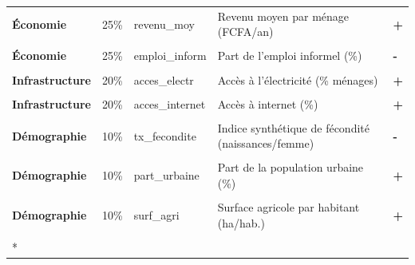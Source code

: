 \documentclass[
]{article}
\begin{document}
\begin{longtable}[t]{>{}lll>{\raggedright\arraybackslash}p{7cm}>{}l}
\textcolor[HTML]{B92346}{\textbf{Économie}} & 25\% & revenu\_moy & Revenu moyen par ménage (FCFA/an) & \textbf{+}\\
\addlinespace
\textcolor[HTML]{B92346}{\textbf{\cellcolor{gray!10}{Économie}}} & \cellcolor{gray!10}{25\%} & \cellcolor{gray!10}{tx\_chomage} & \cellcolor{gray!10}{Taux de chômage (\%)} & \textbf{\cellcolor{gray!10}{-}}\\
\textcolor[HTML]{B92346}{\textbf{Économie}} & 25\% & emploi\_inform & Part de l'emploi informel (\%) & \textbf{-}\\
\textcolor[HTML]{B92346}{\textbf{\cellcolor{gray!10}{Économie}}} & \cellcolor{gray!10}{25\%} & \cellcolor{gray!10}{pib\_regional} & \cellcolor{gray!10}{PIB régional (milliards FCFA)} & \textbf{\cellcolor{gray!10}{+}}\\
\textcolor[HTML]{B92346}{\textbf{Infrastructure}} & 20\% & acces\_electr & Accès à l'électricité (\% ménages) & \textbf{+}\\
\textcolor[HTML]{B92346}{\textbf{\cellcolor{gray!10}{Infrastructure}}} & \cellcolor{gray!10}{20\%} & \cellcolor{gray!10}{densite\_routiere} & \cellcolor{gray!10}{Densité du réseau routier (km/100 km2)} & \textbf{\cellcolor{gray!10}{+}}\\
\addlinespace
\textcolor[HTML]{B92346}{\textbf{Infrastructure}} & 20\% & acces\_internet & Accès à internet (\%) & \textbf{+}\\
\textcolor[HTML]{B92346}{\textbf{\cellcolor{gray!10}{Infrastructure}}} & \cellcolor{gray!10}{20\%} & \cellcolor{gray!10}{idh\_subnational} & \cellcolor{gray!10}{IDH sous-national (indice [0-1])} & \textbf{\cellcolor{gray!10}{+}}\\
\textcolor[HTML]{B92346}{\textbf{Démographie}} & 10\% & tx\_fecondite & Indice synthétique de fécondité (naissances/femme) & \textbf{-}\\
\textcolor[HTML]{B92346}{\textbf{\cellcolor{gray!10}{Démographie}}} & \cellcolor{gray!10}{10\%} & \cellcolor{gray!10}{densite\_pop} & \cellcolor{gray!10}{Densité de population (hab./km2)} & \textbf{\cellcolor{gray!10}{+}}\\
\textcolor[HTML]{B92346}{\textbf{Démographie}} & 10\% & part\_urbaine & Part de la population urbaine (\%) & \textbf{+}\\
\addlinespace
\textcolor[HTML]{B92346}{\textbf{\cellcolor{gray!10}{Démographie}}} & \cellcolor{gray!10}{10\%} & \cellcolor{gray!10}{tx\_emploi\_fem} & \cellcolor{gray!10}{Taux d'emploi des femmes (\%)} & \textbf{\cellcolor{gray!10}{+}}\\
\textcolor[HTML]{B92346}{\textbf{Démographie}} & 10\% & surf\_agri & Surface agricole par habitant (ha/hab.) & \textbf{+}\\
\textcolor[HTML]{B92346}{\textbf{\cellcolor{gray!10}{Démographie}}} & \cellcolor{gray!10}{10\%} & \cellcolor{gray!10}{secu\_alim} & \cellcolor{gray!10}{Score de sécurité alimentaire [0-100]} & \textbf{\cellcolor{gray!10}{+}}\\*
\end{longtable}
\endgroup{}
\end{document}
